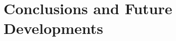 \chapter{Conclusions and Future Developments}
\label{ch7_concl}
\thispagestyle{empty}

\vspace{0.5cm}

% 
